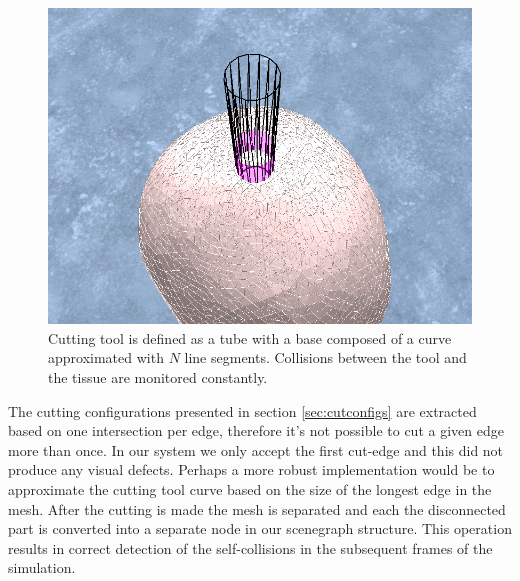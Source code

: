 \begin{figure}[H]
  \centering
  \includegraphics[width=0.6\linewidth]{figures/evaluation/craniotomytube.png}
  \caption{\label{fig:craniotomytube}
  {Cutting tool is defined as a tube with a base composed of a curve approximated with $N$ line segments. 
  Collisions between the tool and the tissue are monitored constantly.}
}
\end{figure}

The cutting configurations presented in section \ref{sec:cutconfigs} are extracted based on one intersection per edge, therefore
it's not possible to cut a given edge more than once. In our system we only accept the first cut-edge and this did not produce any 
visual defects. Perhaps a more robust implementation would be to approximate the cutting tool curve based on the size of the longest 
edge in the mesh. After the cutting is made the mesh is separated and each the disconnected part is converted into a separate node
in our scenegraph structure. This operation results in correct detection of the self-collisions in the subsequent frames of the simulation.

